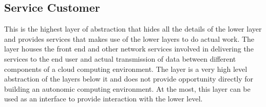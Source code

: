 \subsection{Service Customer}
This is the highest layer of abstraction that hides all the details of the lower layer and provides services that makes use of the lower layers to do actual work. The layer houses the front end and other network services involved in delivering the services to the end user and actual transmission of data between different components of a cloud computing environment.
The layer is a very high level abstraction of the layers below it and does not provide opportunity directly for building an autonomic computing environment. At the most, this layer can be used as an interface to provide interaction with the lower level.

